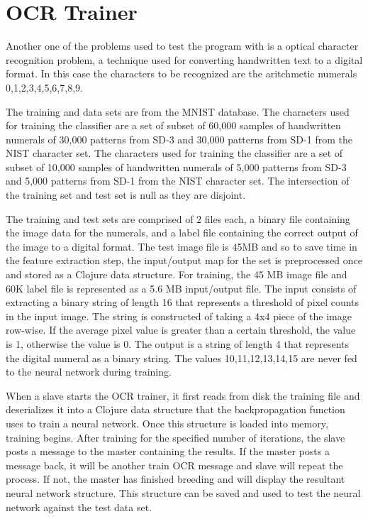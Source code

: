 \chapter[OCR Trainer]{OCR Trainer}
Another one of the problems used to test the program with is a optical character recognition problem, a technique used for converting handwritten text to a digital format. In this case the characters to be recognized are the aritchmetic numerals 0,1,2,3,4,5,6,7,8,9.

The training and data sets are from the MNIST database\cite{mnist}.
The characters used for training the classifier are a set of subset of 60,000 samples of handwritten numerals of 30,000 patterns from SD-3 and 30,000 patterns from SD-1 from the NIST character set. 
The characters used for training the classifier are a set of subset of 10,000 samples of handwritten numerals of 5,000 patterns from SD-3 and 5,000 patterns from SD-1 from the NIST character set. 
The intersection of the training set and test set is null as they are disjoint.

The training and test sets are comprised of 2 files each, a binary file containing the image data for the numerals, and a label file containing the correct output of the image to a digital format. 
The test image file is 45MB and so to save time in the feature extraction step, the input/output map for the set is preprocessed once and stored as a Clojure data structure. 
For training, the 45 MB image file and 60K label file is represented as a 5.6 MB input/output file. 
The input consists of extracting a binary string of length 16 that represents a threshold of pixel counts in the input image. 
The string is constructed of taking a 4x4 piece of the image row-wise. 
If the average pixel value is greater than a certain threshold, the value is 1, otherwise the value is 0. 
The output is a string of length 4 that represents the digital numeral as a binary string. 
The values 10,11,12,13,14,15 are never fed to the neural network during training.

When a slave starts the OCR trainer, it first reads from disk the training file and deserializes it into a Clojure data structure that the backpropagation function uses to train a neural network. 
Once this structure is loaded into memory, training begins. 
After training for the specified number of iterations, the slave posts a message to the master containing the results. 
If the master posts a message back, it will be another train OCR message and slave will repeat the process. 
If not, the master has finished breeding and will display the resultant neural network structure. 
This structure can be saved and used to test the neural network
against the test data set.

